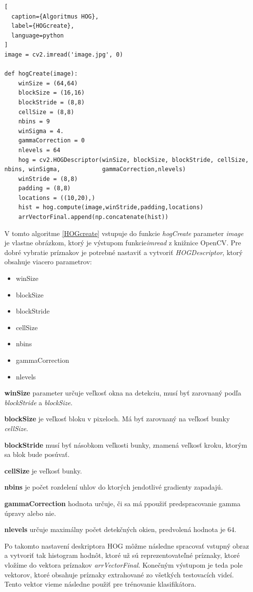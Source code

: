 \begin{lstlisting}[
  caption={Algoritmus HOG},
  label={HOGcreate},
  language=python
]
image = cv2.imread('image.jpg', 0)

def hogCreate(image):
    winSize = (64,64)
    blockSize = (16,16)
    blockStride = (8,8)
    cellSize = (8,8)
    nbins = 9
    winSigma = 4.
    gammaCorrection = 0
    nlevels = 64
    hog = cv2.HOGDescriptor(winSize, blockSize, blockStride, cellSize, nbins, winSigma,            gammaCorrection,nlevels)
    winStride = (8,8)
    padding = (8,8)
    locations = ((10,20),)
    hist = hog.compute(image,winStride,padding,locations)
    arrVectorFinal.append(np.concatenate(hist))
\end{lstlisting}

V tomto algoritme \ref{HOGcreate} vstupuje do funkcie \textit{hogCreate} parameter \textit{image} je vlastne obrázkom, ktorý je výstupom funkcie\textit{imread} z knižnice OpenCV. Pre dobré vybratie príznakov je potrebné nastaviť a vytvoriť \textit{HOGDescriptor}, ktorý obsahuje viacero parametrov:

\begin{itemize}
\item winSize
\item blockSize
\item blockStride
\item cellSize
\item nbins
\item gammaCorrection
\item nlevels 
\end{itemize}

\textbf{winSize} parameter určuje veľkosť okna na detekciu, musí byť zarovnaný podľa \textit{blockStride} a \textit{blockSize}.

\textbf{blockSize} je veľkosť bloku v pixeloch. Má byť zarovnaný na veľkosť bunky \textit{cellSize}.

\textbf{blockStride} musí byť násobkom veľkosti bunky, znamená veľkosť kroku, ktorým sa blok bude posúvať.

\textbf{cellSize} je veľkosť bunky.

\textbf{nbins} je počet rozdelení uhlov do ktorých jendotlivé gradienty zapadajú.

\textbf{gammaCorrection} hodnota určuje, či sa má ppoužiť predspracovanie gamma úpravy alebo nie.

\textbf{nlevels} určuje maximálny počet detekčných okien, predvolená hodnota je 64.

Po takomto nastavení deskriptora HOG môžme následne spracovať vstupný obraz a vytvoriť tak histogram hodnôt, ktoré už sú reprezentovateľné príznaky, ktoré vložíme do vektora príznakov \textit{arrVectorFinal}. Konečným výstupom je teda pole vektorov, ktoré obsahuje príznaky extrahované zo všetkých testovacích videí. Tento vektor vieme následne použiť pre trénovanie klasifikátora.  


